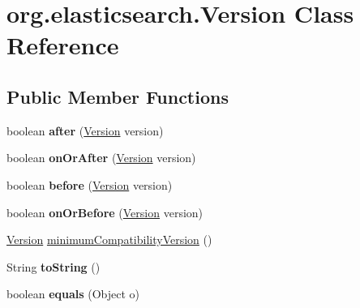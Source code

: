 \hypertarget{classorg_1_1elasticsearch_1_1_version}{}\section{org.\+elasticsearch.\+Version Class Reference}
\label{classorg_1_1elasticsearch_1_1_version}
\subsection*{Public Member Functions}
\begin{DoxyCompactItemize}
\item 
\hypertarget{classorg_1_1elasticsearch_1_1_version_a11d948e265c4257f9448d85eee90825c}{}\label{classorg_1_1elasticsearch_1_1_version_a11d948e265c4257f9448d85eee90825c} 
boolean {\bfseries after} (\hyperlink{classorg_1_1elasticsearch_1_1_version}{Version} version)
\item 
\hypertarget{classorg_1_1elasticsearch_1_1_version_ae710178d9a0c322226e5790df003e3c9}{}\label{classorg_1_1elasticsearch_1_1_version_ae710178d9a0c322226e5790df003e3c9} 
boolean {\bfseries on\+Or\+After} (\hyperlink{classorg_1_1elasticsearch_1_1_version}{Version} version)
\item 
\hypertarget{classorg_1_1elasticsearch_1_1_version_a49e0c223a8e06afcd81731643b3c4316}{}\label{classorg_1_1elasticsearch_1_1_version_a49e0c223a8e06afcd81731643b3c4316} 
boolean {\bfseries before} (\hyperlink{classorg_1_1elasticsearch_1_1_version}{Version} version)
\item 
\hypertarget{classorg_1_1elasticsearch_1_1_version_a9fbe54cd0de0cd556a7d1b4505965d0c}{}\label{classorg_1_1elasticsearch_1_1_version_a9fbe54cd0de0cd556a7d1b4505965d0c} 
boolean {\bfseries on\+Or\+Before} (\hyperlink{classorg_1_1elasticsearch_1_1_version}{Version} version)
\item 
\hyperlink{classorg_1_1elasticsearch_1_1_version}{Version} \hyperlink{classorg_1_1elasticsearch_1_1_version_af19fa9cd6c365d9b6f1ab0003463e259}{minimum\+Compatibility\+Version} ()
\item 
\hypertarget{classorg_1_1elasticsearch_1_1_version_add4796816f356001d35f37ce210fe0d7}{}\label{classorg_1_1elasticsearch_1_1_version_add4796816f356001d35f37ce210fe0d7} 
String {\bfseries to\+String} ()
\item 
\hypertarget{classorg_1_1elasticsearch_1_1_version_a1b419a92f27a4035da69fc93e5ad2bbd}{}\label{classorg_1_1elasticsearch_1_1_version_a1b419a92f27a4035da69fc93e5ad2bbd} 
boolean {\bfseries equals} (Object o)

\end{DoxyCompactItemize}
